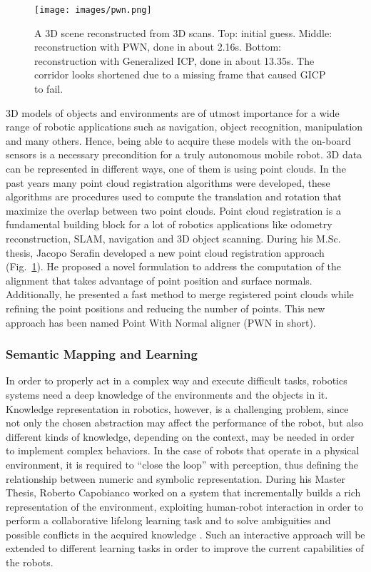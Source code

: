 \documentclass[conference]{IEEEtran}
\begin{document}
\begin{figure}[t!]
\begin{center}
\texttt{[image: images/pwn.png]}
\end{center}
\caption{A 3D scene reconstructed from 3D scans. Top: initial guess. Middle: reconstruction with PWN, done in about 2.16s. Bottom: reconstruction with Generalized ICP, done in about 13.35s. The corridor looks shortened due to a missing frame that caused GICP to fail.}\label{fig:pwn}
\end{figure}

3D models of objects and environments are of utmost importance for a wide range of robotic applications such as navigation, object recognition, manipulation and many others. Hence, being able to acquire these models with the on-board sensors is a necessary precondition for a truly autonomous mobile robot. 3D data can be represented in different ways, one of them is using point clouds. In the past years many point cloud registration algorithms were developed, these algorithms are procedures used to compute the translation and rotation that maximize the overlap between two point clouds. Point cloud registration is a fundamental building block for a lot of robotics applications like odometry reconstruction, SLAM, navigation and 3D object scanning. During his M.Sc. thesis, Jacopo Serafin developed a new point cloud registration approach (Fig.~\ref{fig:pwn}). He proposed a novel formulation to address the computation of the alignment that takes advantage of point position and surface normals. Additionally, he presented a fast method to merge registered point clouds while refining the point positions and reducing the number of points. This new approach has been named Point With Normal aligner (PWN in short).   

\subsubsection{Semantic Mapping and Learning}\label{sec:semantic_map}
In order to properly act in a complex way and execute difficult tasks, robotics systems need a deep knowledge of the environments and the objects in it. Knowledge representation in robotics, however, is a challenging problem, since not only the chosen abstraction may affect the performance of the robot, but also different kinds of knowledge, depending on the context, may be needed in order to implement complex behaviors. In the case of robots that operate in a physical environment, it is required to “close the loop” with perception, thus defining the relationship between numeric and symbolic representation. During his Master Thesis, Roberto Capobianco worked on a system that incrementally builds a rich representation of the environment, exploiting human-robot interaction in order to perform a collaborative lifelong learning task and to solve ambiguities and possible conflicts in the acquired knowledge \cite{bastianelli2013line}\cite{bastianelliBCGIN13}. Such an interactive approach will be extended to different learning tasks in order to improve the current capabilities of the robots.
\end{document}
